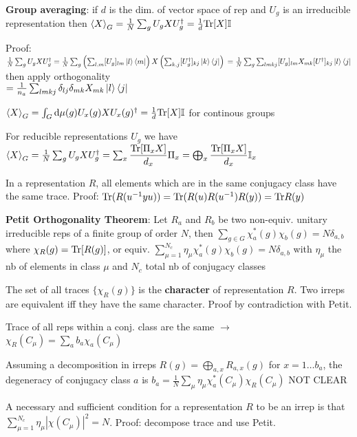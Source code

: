 \begin{squishlist}
    \item \textbf{Group averaging}: if $d$ is the dim. of vector space of rep and $U_g$ is an irreducible representation then $\braket{X}_G = \frac{1}{N} \sum_g U_g X U_g^{\dagger} = \frac{1}{d} \mathrm{Tr}[X] \mathbb{I}$  
    \item Proof: $\frac{1}{N} \sum_g U_g X U_g^{\dagger} = \frac{1}{N} \sum_g \left( \sum_{l,m}[U_g]_{lm} \ket{l}\bra{m}\right) X \left( \sum_{k,j} [U_g^{\dagger}]_{kj}\ket{k}\bra{j}\right) \\ 
    = \frac{1}{N} \sum_g \sum_{lmkj} [U_g]_{lm} X_{mk} [U^{\dagger}]_{kj} \ket{l}\bra{j}$ then apply orthogonality \\
    $= \frac{1}{n_a} \sum_{lmkj} \delta_{lj} \delta_{mk} X_{mk} \ket{l}\bra{j} $

    \item $\braket{X}_G = \int_G \textrm{d} \mu(g) U_x(g) X U_x(g)^{\dagger} = \frac{1}{d} \mathrm{Tr}[X] \mathbb{I}$ for continous groups
    \item For reducible representations $U_g$ we have \\
    $\braket{X}_G = \frac{1}{N} \sum_g U_g X U_g^{\dagger} = \sum_x \dfrac{\mathrm{Tr}[\Pi_x X]}{d_x} \Pi_x = \bigoplus_x \dfrac{\mathrm{Tr}[\Pi_x X]}{d_x} \mathbb{I}_x$

    \item In a representation $R$, all elements which are in the same conjugacy class have the same trace. Proof: $\mathrm{Tr}(R(u^{-1}y u)) = \mathrm{Tr}(R(u)R(u^{-1})R(y)) = \mathrm{Tr} R(y)$
    \item \textbf{Petit Orthogonality Theorem}: Let $R_a$ and $R_b$ be two non-equiv. unitary irreducible reps of a finite group of order $N$, then $\sum_{g \in G} \chi^*_a(g) \chi_b(g) = N \delta_{a,b}$ \\ 
    where $\chi_R(g) = \mathrm{Tr}[R(g)]$, or equiv. $\sum_{\mu =1}^{N_c} \eta_{\mu}\chi^*_a(g) \chi_b(g) = N \delta_{a,b}$ with $\eta_{\mu}$ the nb of elements in class $\mu$ and $N_c$ total nb of conjugacy classes

    \item The set of all traces $\{\chi_R(g)\}$ is the \textbf{character} of representation $R$. Two irreps are equivalent iff they have the same character.
    Proof by contradiction with Petit.

    \item Trace of all reps within a conj. class are the same $\rightarrow$ $\chi_R(C_{\mu}) = \sum_a b_a \chi_a ( C_{\mu})$
    \item Assuming a decomposition in irreps $R(g) = \bigoplus_{a,x}R_{a,x}(g)$ for $x = 1 \ldots b_a$, the degeneracy of conjugacy class $a$ is $b_a = \frac{1}{N} \sum_{\mu} \eta_{\mu} \chi^*_a(C_{\mu})\chi_R(C_{\mu})$ NOT CLEAR
    
    \item A necessary and sufficient condition for a representation $R$ to be an irrep is that \\
    $\sum_{\mu = 1}^{N_c} \eta_{\mu} |\chi(C_{\mu})|^2 = N$. Proof: decompose trace and use Petit.
\end{squishlist}


